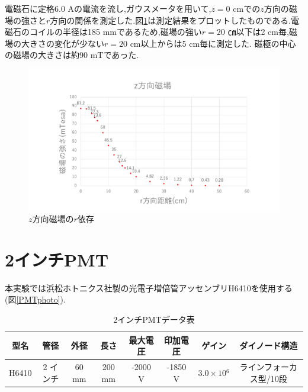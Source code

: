 \newpage
電磁石に定格6.0 Aの電流を流し,ガウスメータを用いて,$z=0$ cmでの$z$方向の磁場の強さと$r$方向の関係を測定した.図\ref{maggraph01}は測定結果をプロットしたものである.電磁石のコイルの半径は185 mmであるため,磁場の強い$r=20$ ㎝以下は2 cm毎,磁場の大きさの変化が少ない$r=20$ cm以上からは5 cm毎に測定した.
磁極の中心の磁場の大きさは約90 mTであった.
\begin{figure}[h!]
	\centering
	\includegraphics[width=15cm]{fig/iguchi/maggraph01.pdf}
	\caption{$z$方向磁場の$r$依存}
	\label{maggraph01}
\end{figure}


\newpage
\section{2インチPMT}
本実験では浜松ホトニクス社製の光電子増倍管アッセンブリH6410\cite{pmtH6410}を使用する(図\ref{PMTphoto}).

\begin{table}[tbp]
	\centering
	 \begin{tabular}{cccccccc}\hline
	型名& 管径 & 外径 & 長さ & 最大電圧 & 印加電圧 & ゲイン & ダイノード構造 \\ \hline \hline
	H6410 & 2 インチ & 60 mm & 200 mm & -2000 V & -1850 V & $3.0\times10{^{6}}$ &ラインフォーカス型/10段 \\ \hline
	\end{tabular}
	  \caption{2インチPMTデータ表}
\end{table}

